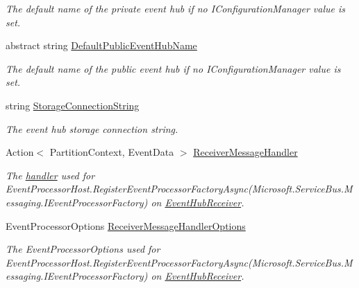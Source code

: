 \begin{DoxyCompactItemize}
\begin{DoxyCompactList}\small\item\em The default name of the private event hub if no I\+Configuration\+Manager value is set. \end{DoxyCompactList}\item 
abstract string \hyperlink{classCqrs_1_1Azure_1_1ServiceBus_1_1AzureEventHub_a11645c85a3c749ca664480867c6fae3c_a11645c85a3c749ca664480867c6fae3c}{Default\+Public\+Event\+Hub\+Name}
\begin{DoxyCompactList}\small\item\em The default name of the public event hub if no I\+Configuration\+Manager value is set. \end{DoxyCompactList}\item 
string \hyperlink{classCqrs_1_1Azure_1_1ServiceBus_1_1AzureEventHub_a2b102538e8b72f9990578fa3bcbe4c12_a2b102538e8b72f9990578fa3bcbe4c12}{Storage\+Connection\+String}
\begin{DoxyCompactList}\small\item\em The event hub storage connection string. \end{DoxyCompactList}\item 
Action$<$ Partition\+Context, Event\+Data $>$ \hyperlink{classCqrs_1_1Azure_1_1ServiceBus_1_1AzureEventHub_a8c9faa7096d72a45803e6e63a1b3cf30_a8c9faa7096d72a45803e6e63a1b3cf30}{Receiver\+Message\+Handler}
\begin{DoxyCompactList}\small\item\em The \hyperlink{}{handler} used for Event\+Processor\+Host.\+Register\+Event\+Processor\+Factory\+Async(\+Microsoft.\+Service\+Bus.\+Messaging.\+I\+Event\+Processor\+Factory) on \hyperlink{classCqrs_1_1Azure_1_1ServiceBus_1_1AzureEventHub_a1b12b47dbb9b9afe2014477a2e457c35_a1b12b47dbb9b9afe2014477a2e457c35}{Event\+Hub\+Receiver}. \end{DoxyCompactList}\item 
Event\+Processor\+Options \hyperlink{classCqrs_1_1Azure_1_1ServiceBus_1_1AzureEventHub_ad3a0c2f32d5771fb1f4420fc33c75968_ad3a0c2f32d5771fb1f4420fc33c75968}{Receiver\+Message\+Handler\+Options}
\begin{DoxyCompactList}\small\item\em The Event\+Processor\+Options used for Event\+Processor\+Host.\+Register\+Event\+Processor\+Factory\+Async(\+Microsoft.\+Service\+Bus.\+Messaging.\+I\+Event\+Processor\+Factory) on \hyperlink{classCqrs_1_1Azure_1_1ServiceBus_1_1AzureEventHub_a1b12b47dbb9b9afe2014477a2e457c35_a1b12b47dbb9b9afe2014477a2e457c35}{Event\+Hub\+Receiver}. \end{DoxyCompactList}\item 

\end{DoxyCompactItemize}
